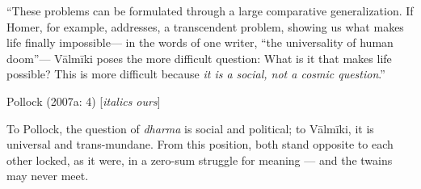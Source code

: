 \newpage

\begin{myquote}
“These problems can be formulated through a large comparative generalization. If Homer, for example, addresses, a transcendent problem, showing us what makes life finally impossible— in the words of one writer, “the universality of human doom”— Vālmīki poses the more difficult question: What is it that makes life possible? This is more difficult because {\sl it is a social, not a cosmic question}.” 

\hfill Pollock (2007a: 4) [{\sl italics ours}]
\end{myquote}

To Pollock, the question of {\sl dharma} is social and political; to Vālmīki, it is universal and trans-mundane. From this position, both stand opposite to each other locked, as it were, in a zero-sum struggle for meaning — and the twains may never meet. 


